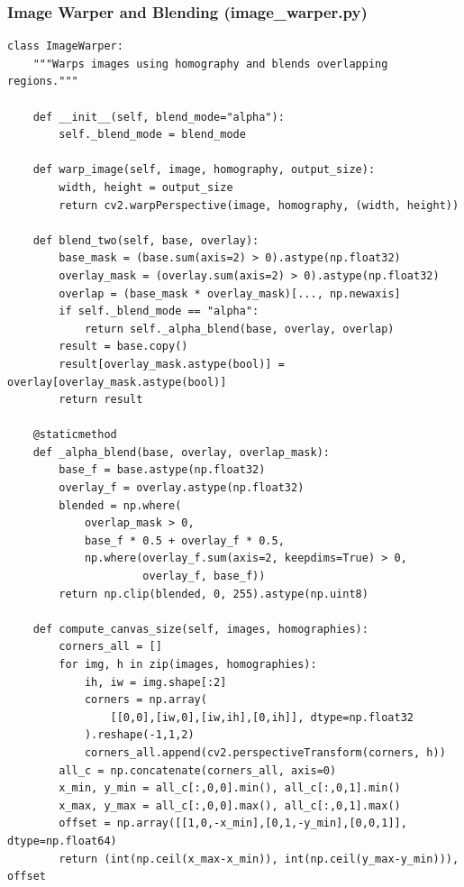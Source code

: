 \documentclass[a4paper,12pt]{article}
\begin{document}
\subsubsection*{Image Warper and Blending (image\_warper.py)}
\begin{lstlisting}
class ImageWarper:
    """Warps images using homography and blends overlapping regions."""

    def __init__(self, blend_mode="alpha"):
        self._blend_mode = blend_mode

    def warp_image(self, image, homography, output_size):
        width, height = output_size
        return cv2.warpPerspective(image, homography, (width, height))

    def blend_two(self, base, overlay):
        base_mask = (base.sum(axis=2) > 0).astype(np.float32)
        overlay_mask = (overlay.sum(axis=2) > 0).astype(np.float32)
        overlap = (base_mask * overlay_mask)[..., np.newaxis]
        if self._blend_mode == "alpha":
            return self._alpha_blend(base, overlay, overlap)
        result = base.copy()
        result[overlay_mask.astype(bool)] = overlay[overlay_mask.astype(bool)]
        return result

    @staticmethod
    def _alpha_blend(base, overlay, overlap_mask):
        base_f = base.astype(np.float32)
        overlay_f = overlay.astype(np.float32)
        blended = np.where(
            overlap_mask > 0,
            base_f * 0.5 + overlay_f * 0.5,
            np.where(overlay_f.sum(axis=2, keepdims=True) > 0,
                     overlay_f, base_f))
        return np.clip(blended, 0, 255).astype(np.uint8)

    def compute_canvas_size(self, images, homographies):
        corners_all = []
        for img, h in zip(images, homographies):
            ih, iw = img.shape[:2]
            corners = np.array(
                [[0,0],[iw,0],[iw,ih],[0,ih]], dtype=np.float32
            ).reshape(-1,1,2)
            corners_all.append(cv2.perspectiveTransform(corners, h))
        all_c = np.concatenate(corners_all, axis=0)
        x_min, y_min = all_c[:,0,0].min(), all_c[:,0,1].min()
        x_max, y_max = all_c[:,0,0].max(), all_c[:,0,1].max()
        offset = np.array([[1,0,-x_min],[0,1,-y_min],[0,0,1]], dtype=np.float64)
        return (int(np.ceil(x_max-x_min)), int(np.ceil(y_max-y_min))), offset
\end{lstlisting}
\end{document}

